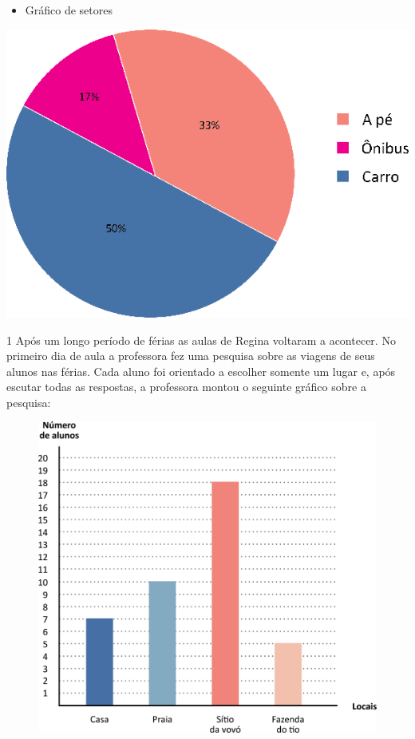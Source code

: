 {\pagebreak
\begin{itemize}
\item
  Gráfico de setores
\end{itemize}

\includegraphics[width=\textwidth]{./media/image78.png}
}


\num{1} Após um longo período de férias as aulas de Regina voltaram a acontecer.
No primeiro dia de aula a professora fez uma pesquisa sobre as viagens de seus alunos nas férias. Cada aluno foi
orientado a escolher somente um lugar e, após escutar todas as respostas,
a professora montou o seguinte gráfico sobre a pesquisa:

\begin{figure}[htpb!]
\centering
\includegraphics[width=\textwidth]{./media/image79.png}
\end{figure}

